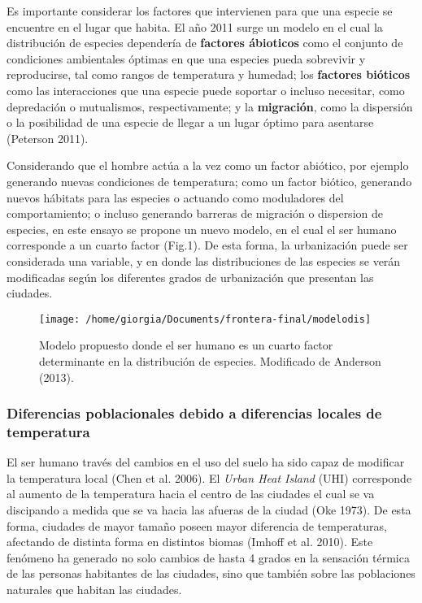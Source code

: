 \documentclass[]{article}
\begin{document}
Es importante considerar los factores que intervienen para que una
especie se encuentre en el lugar que habita. El año 2011 surge un modelo
en el cual la distribución de especies dependería de \textbf{factores
ábioticos} como el conjunto de condiciones ambientales óptimas en que
una especies pueda sobrevivir y reproducirse, tal como rangos de
temperatura y humedad; los \textbf{factores bióticos} como las
interacciones que una especie puede soportar o incluso necesitar, como
depredación o mutualismos, respectivamente; y la \textbf{migración},
como la dispersión o la posibilidad de una especie de llegar a un lugar
óptimo para asentarse (Peterson 2011).

Considerando que el hombre actúa a la vez como un factor abiótico, por
ejemplo generando nuevas condiciones de temperatura; como un factor
biótico, generando nuevos hábitats para las especies o actuando como
moduladores del comportamiento; o incluso generando barreras de
migración o dispersion de especies, en este ensayo se propone un nuevo
modelo, en el cual el ser humano corresponde a un cuarto factor (Fig.1).
De esta forma, la urbanización puede ser considerada una variable, y en
donde las distribuciones de las especies se verán modificadas según los
diferentes grados de urbanización que presentan las ciudades.

\begin{figure}
\texttt{[image: /home/giorgia/Documents/frontera-final/modelodis]} \caption{Modelo propuesto donde el ser humano es un cuarto factor determinante en la distribución de especies. Modificado de Anderson (2013).}\label{fig:unnamed-chunk-1}
\end{figure}

\subsubsection{Diferencias poblacionales debido a diferencias locales de
temperatura}\label{diferencias-poblacionales-debido-a-diferencias-locales-de-temperatura}

El ser humano través del cambios en el uso del suelo ha sido capaz de
modificar la temperatura local (Chen et al. 2006). El \emph{Urban Heat
Island} (UHI) corresponde al aumento de la temperatura hacia el centro
de las ciudades el cual se va discipando a medida que se va hacia las
afueras de la ciudad (Oke 1973). De esta forma, ciudades de mayor tamaño
poseen mayor diferencia de temperaturas, afectando de distinta forma en
distintos biomas (Imhoff et al. 2010). Este fenómeno ha generado no solo
cambios de hasta 4 grados en la sensación térmica de las personas
habitantes de las ciudades, sino que también sobre las poblaciones
naturales que habitan las ciudades.
\end{document}
